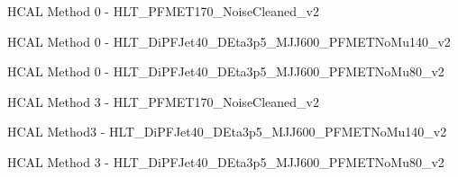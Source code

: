 \documentclass[8pt]{beamer}
\begin{document}
\begin{frame}{HCAL Method 0 - HLT\_PFMET170\_NoiseCleaned\_v2}



\end{frame}

\begin{frame}{HCAL Method 0 - HLT\_DiPFJet40\_DEta3p5\_MJJ600\_PFMETNoMu140\_v2}



\end{frame}

\begin{frame}{HCAL Method 0 - HLT\_DiPFJet40\_DEta3p5\_MJJ600\_PFMETNoMu80\_v2}



\end{frame}

\begin{frame}{HCAL Method 3 - HLT\_PFMET170\_NoiseCleaned\_v2}



\end{frame}

\begin{frame}{HCAL Method3 - HLT\_DiPFJet40\_DEta3p5\_MJJ600\_PFMETNoMu140\_v2}



\end{frame}

\begin{frame}{HCAL Method 3 - HLT\_DiPFJet40\_DEta3p5\_MJJ600\_PFMETNoMu80\_v2}



\end{frame}
\end{document}
